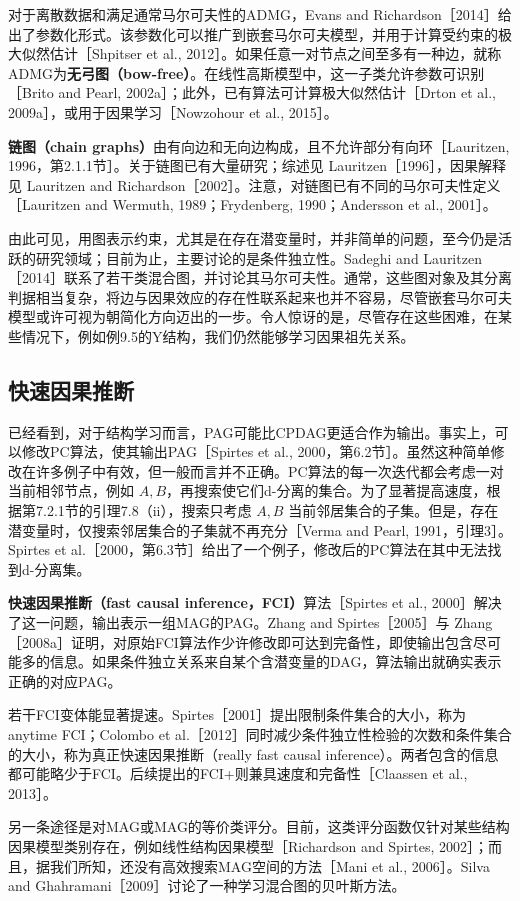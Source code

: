 对于离散数据和满足通常马尔可夫性的ADMG，Evans and Richardson［2014］给出了参数化形式。该参数化可以推广到嵌套马尔可夫模型，并用于计算受约束的极大似然估计［Shpitser et al., 2012］。如果任意一对节点之间至多有一种边，就称ADMG为\textbf{无弓图（bow-free）}。在线性高斯模型中，这一子类允许参数可识别［Brito and Pearl, 2002a］；此外，已有算法可计算极大似然估计［Drton et al., 2009a］，或用于因果学习［Nowzohour et al., 2015］。

\textbf{链图（chain graphs）}由有向边和无向边构成，且不允许部分有向环［Lauritzen, 1996，第2.1.1节］。关于链图已有大量研究；综述见 Lauritzen［1996］，因果解释见 Lauritzen and Richardson［2002］。注意，对链图已有不同的马尔可夫性定义［Lauritzen and Wermuth, 1989；Frydenberg, 1990；Andersson et al., 2001］。

由此可见，用图表示约束，尤其是在存在潜变量时，并非简单的问题，至今仍是活跃的研究领域；目前为止，主要讨论的是条件独立性。Sadeghi and Lauritzen［2014］联系了若干类混合图，并讨论其马尔可夫性。通常，这些图对象及其分离判据相当复杂，将边与因果效应的存在性联系起来也并不容易，尽管嵌套马尔可夫模型或许可视为朝简化方向迈出的一步。令人惊讶的是，尽管存在这些困难，在某些情况下，例如例9.5的Y结构，我们仍然能够学习因果祖先关系。

\subsection{快速因果推断}

已经看到，对于结构学习而言，PAG可能比CPDAG更适合作为输出。事实上，可以修改PC算法，使其输出PAG［Spirtes et al., 2000，第6.2节］。虽然这种简单修改在许多例子中有效，但一般而言并不正确。PC算法的每一次迭代都会考虑一对当前相邻节点，例如 $A,B$，再搜索使它们d-分离的集合。为了显著提高速度，根据第7.2.1节的引理7.8（ii），搜索只考虑 $A,B$ 当前邻居集合的子集。但是，存在潜变量时，仅搜索邻居集合的子集就不再充分［Verma and Pearl, 1991，引理3］。Spirtes et al.［2000，第6.3节］给出了一个例子，修改后的PC算法在其中无法找到d-分离集。

\textbf{快速因果推断（fast causal inference，FCI）}算法［Spirtes et al., 2000］解决了这一问题，输出表示一组MAG的PAG。Zhang and Spirtes［2005］与 Zhang［2008a］证明，对原始FCI算法作少许修改即可达到完备性，即使输出包含尽可能多的信息。如果条件独立关系来自某个含潜变量的DAG，算法输出就确实表示正确的对应PAG。

若干FCI变体能显著提速。Spirtes［2001］提出限制条件集合的大小，称为anytime FCI；Colombo et al.［2012］同时减少条件独立性检验的次数和条件集合的大小，称为真正快速因果推断（really fast causal inference）。两者包含的信息都可能略少于FCI。后续提出的FCI+则兼具速度和完备性［Claassen et al., 2013］。

另一条途径是对MAG或MAG的等价类评分。目前，这类评分函数仅针对某些结构因果模型类别存在，例如线性结构因果模型［Richardson and Spirtes, 2002］；而且，据我们所知，还没有高效搜索MAG空间的方法［Mani et al., 2006］。Silva and Ghahramani［2009］讨论了一种学习混合图的贝叶斯方法。
\FloatBarrier
